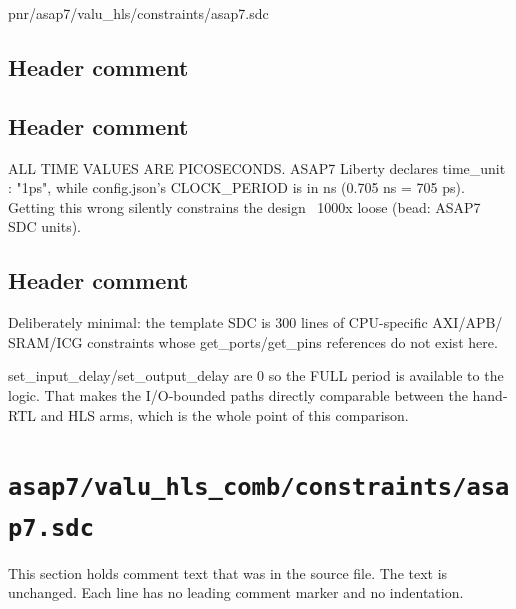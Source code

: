 \begin{relocated}{pnr/asap7/valu_hls/constraints/asap7.sdc}

\subsection*{Header comment}


\subsection*{Header comment}

\begin{textblock}
ALL TIME VALUES ARE PICOSECONDS. ASAP7 Liberty declares time_unit : "1ps",
while config.json's CLOCK_PERIOD is in ns (0.705 ns = 705 ps). Getting this
wrong silently constrains the design ~1000x loose (bead: ASAP7 SDC units).
\end{textblock}

\subsection*{Header comment}

\begin{textblock}
Deliberately minimal: the template SDC is 300 lines of CPU-specific AXI/APB/
SRAM/ICG constraints whose get_ports/get_pins references do not exist here.

set_input_delay/set_output_delay are 0 so the FULL period is available to the
logic. That makes the I/O-bounded paths directly comparable between the
hand-RTL and HLS arms, which is the whole point of this comparison.
\end{textblock}

\end{relocated}

\section{\texttt{asap7/valu\_hls\_comb/constraints/asap7.sdc}}\label{tm:pd:asap7-valu-hls-comb-sdc}

This section holds comment text that was in the source file. The text is unchanged. Each line has no leading comment marker and no indentation.

